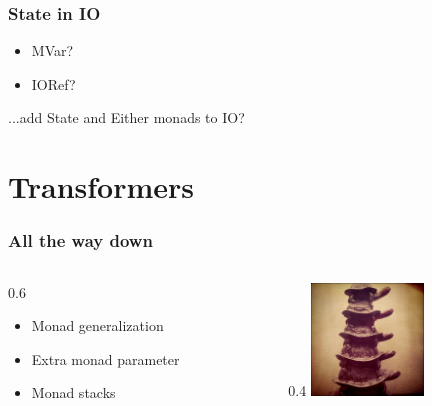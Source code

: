 \documentclass[20pt]{beamer}
\renewcommand{\(}[1]{\begin{columns}[#1]}
\renewcommand{\)}{\end{columns}}
\newcommand{\<}[1]{\begin{column}{#1\textwidth}}
\renewcommand{\>}{\end{column}}
\begin{document}
\begin{frame}
  \frametitle{State in IO}
  \begin{itemize}
  \item MVar?
  \item IORef?
  \end{itemize}
  \pause
  \begin{center}
    ...add State and Either monads to IO?
  \end{center}
\end{frame}




\section{Transformers}

\begin{frame}
  \frametitle{All the way down}
  \({b}
  \<{0.6}
  \begin{itemize}
    \item Monad generalization
    \item Extra monad parameter
    \item Monad stacks
  \end{itemize}
  \>
  \<{0.4}
  \includegraphics[width=3cm]{img/turtles}
  \>
  \)
\end{frame}
\end{document}
